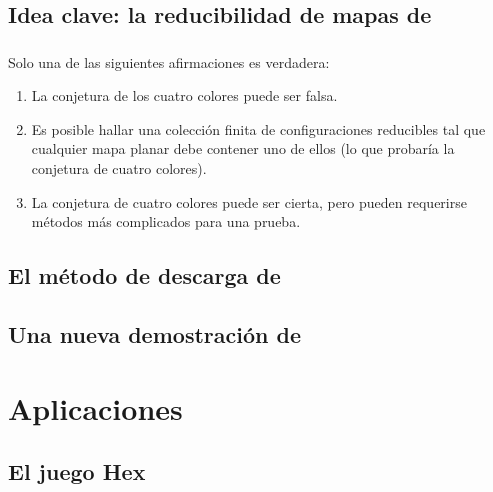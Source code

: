 \documentclass[spanish, utf8,handout]{beamer} %
\theoremstyle{definition}
\begin{document}
\subsection{Idea clave: la reducibilidad de mapas de \citeauthor{birkhoff}}

\begin{frame}
\frametitle{\insertsubsection}

\begin{theorem}\normalfont
Solo una de las siguientes afirmaciones es verdadera:

\begin{enumerate}
	\item La conjetura de los cuatro colores puede ser falsa.
	
	\item Es posible hallar una colección finita de configuraciones reducibles \linebreak tal que cualquier mapa planar debe contener uno de ellos \linebreak (lo que probaría la conjetura de cuatro colores).
	
	\item La conjetura de cuatro colores puede ser cierta, pero pueden \linebreak requerirse métodos más complicados para una prueba.
\end{enumerate}
\end{theorem}
\end{frame}

\subsection{El método de descarga de \citeauthor{appel}}

\subsection{Una nueva demostración de \citeauthor{robertson}}

\section{Aplicaciones}

\subsection{El juego Hex}
\end{document}
